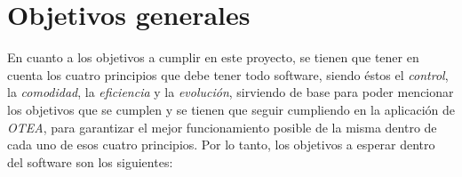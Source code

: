
\section{Objetivos generales}
En cuanto a los objetivos a cumplir en este proyecto, se tienen que tener en
cuenta los cuatro principios que debe tener todo software, siendo éstos el
\textit{control}, la \textit{comodidad}, la \textit{eficiencia} y la
\textit{evolución}, sirviendo de base para poder mencionar los objetivos que se
cumplen y se tienen que seguir cumpliendo en la aplicación de \textit{OTEA},
para garantizar el mejor funcionamiento posible de la misma dentro de cada uno
de esos cuatro principios. Por lo tanto, los objetivos a esperar dentro del
software son los siguientes:
